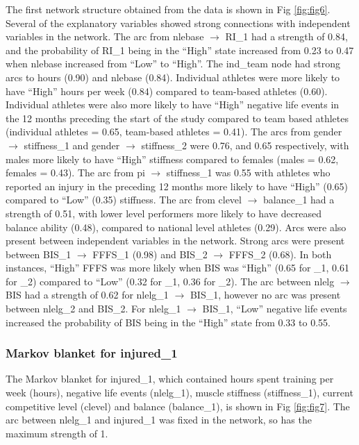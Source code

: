 \documentclass[
  english,
  man]{apa6}
\begin{document}
The first network structure obtained from the data is shown in Fig \ref{fig:fig6}.
Several of the explanatory variables showed strong connections with independent variables in the network.
The arc from nlebase \(\rightarrow\) RI\_1 had a strength of 0.84, and the probability of RI\_1 being in the ``High'' state increased from 0.23 to 0.47 when nlebase increased from ``Low'' to ``High''.
The ind\_team node had strong arcs to hours (0.90) and nlebase (0.84).
Individual athletes were more likely to have ``High'' hours per week (0.84) compared to team-based athletes (0.60).
Individual athletes were also more likely to have ``High'' negative life events in the 12 months preceding the start of the study compared to team based athletes (individual athletes = 0.65, team-based athletes = 0.41).
The arcs from gender \(\rightarrow\) stiffness\_1 and gender \(\rightarrow\) stiffness\_2 were 0.76, and 0.65 respectively, with males more likely to have ``High'' stiffness compared to females (males = 0.62, females = 0.43).
The arc from pi \(\rightarrow\) stiffness\_1 was 0.55 with athletes who reported an injury in the preceding 12 months more likely to have ``High'' (0.65) compared to ``Low'' (0.35) stiffness.
The arc from clevel \(\rightarrow\) balance\_1 had a strength of 0.51, with lower level performers more likely to have decreased balance ability (0.48), compared to national level athletes (0.29).
Arcs were also present between independent variables in the network. Strong arcs were present between BIS\_1 \(\rightarrow\) FFFS\_1 (0.98) and BIS\_2 \(\rightarrow\) FFFS\_2 (0.68).
In both instances, ``High'' FFFS was more likely when BIS was ``High'' (0.65 for \_1, 0.61 for \_2) compared to ``Low'' (0.32 for \_1, 0.36 for \_2).
The arc between nlelg \(\rightarrow\) BIS had a strength of 0.62 for nlelg\_1 \(\rightarrow\) BIS\_1, however no arc was present between nlelg\_2 and BIS\_2.
For nlelg\_1 \(\rightarrow\) BIS\_1, ``Low'' negative life events increased the probability of BIS being in the ``High'' state from 0.33 to 0.55.

\hypertarget{markov-blanket-for-injured_1}{%
\subsubsection{Markov blanket for injured\_1}\label{markov-blanket-for-injured_1}}

The Markov blanket for injured\_1, which contained hours spent training per week (hours), negative life events (nlelg\_1), muscle stiffness (stiffness\_1), current competitive level (clevel) and balance (balance\_1), is shown in Fig \ref{fig:fig7}.
The arc between nlelg\_1 and injured\_1 was fixed in the network, so has the maximum strength of 1.
\end{document}

